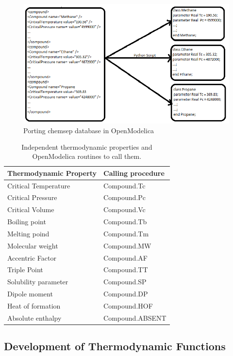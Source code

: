 \documentclass[12pt]{report}
\begin{document}
\begin{figure}
\centering
\includegraphics[width=0.8\linewidth]{BT1}
\caption{Porting chemsep database in OpenModelica}
\label{fig:BT1}
\end{figure}


\begin{table}
\centering
\caption {Independent thermodynamic properties and OpenModelica routines to call them.}
\label{tab:indprop}
\vspace{1ex}
\begin{tabular}{l|l} \hline
Thermodynamic Property & Calling procedure \\ \hline
Critical Temperature & Compound.Tc \\
Critical Pressure & Compound.Pc \\
Critical Volume & Compound.Vc \\
Boiling point & Compound.Tb \\
Melting poind & Compound.Tm \\
Molecular weight & Compound.MW \\
Accentric Factor & Compound.AF \\
Triple Point & Compound.TT \\
Solubility parameter & Compound.SP \\ 
Dipole moment & Compound.DP \\ 
Heat of formation & Compound.HOF \\ 
Absolute enthalpy & Compound.ABSENT \\ \hline
\end{tabular}
\end{table}

\subsection{Development of Thermodynamic Functions}
\end{document}
